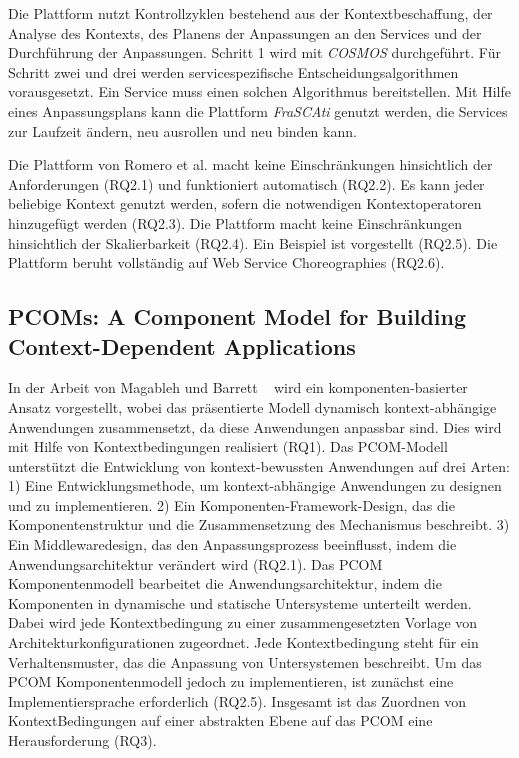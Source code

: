 \documentclass[conference,compsoc]{IEEEtran}
\begin{document}
Die Plattform nutzt Kontrollzyklen bestehend aus der Kontextbeschaffung, der Analyse des Kontexts, des Planens der Anpassungen an den Services und der Durchführung der Anpassungen. Schritt 1 wird mit \textit{COSMOS} durchgeführt. Für Schritt zwei und drei werden servicespezifische Entscheidungsalgorithmen vorausgesetzt. Ein Service muss einen solchen Algorithmus bereitstellen. Mit Hilfe eines Anpassungsplans kann die Plattform \textit{FraSCAti} genutzt werden, die Services zur Laufzeit ändern, neu ausrollen und neu binden kann.

Die Plattform von Romero et al. \cite{RRS10} macht keine Einschränkungen hinsichtlich der Anforderungen (RQ2.1) und funktioniert automatisch (RQ2.2). Es kann jeder beliebige Kontext genutzt werden, sofern die notwendigen Kontextoperatoren hinzugefügt werden (RQ2.3). Die Plattform macht keine Einschränkungen hinsichtlich der Skalierbarkeit (RQ2.4). Ein Beispiel ist vorgestellt (RQ2.5). Die Plattform beruht vollständig auf Web Service Choreographies (RQ2.6).

\subsection{PCOMs: A Component Model for Building Context-Dependent Applications}
In der Arbeit von Magableh und Barrett ~\cite{magableh2009pcoms} wird ein komponenten-basierter Ansatz vorgestellt, wobei das präsentierte Modell dynamisch kontext-abhängige Anwendungen zusammensetzt, da diese Anwendungen anpassbar sind. Dies wird mit Hilfe von Kontextbedingungen realisiert (RQ1). Das PCOM-Modell unterstützt die Entwicklung von kontext-bewussten Anwendungen auf drei Arten: 1) Eine Entwicklungsmethode, um kontext-abhängige Anwendungen zu designen und zu implementieren. 2) Ein Komponenten-Framework-Design, das die Komponentenstruktur und die Zusammensetzung des Mechanismus beschreibt. 3) Ein Middlewaredesign, das den Anpassungsprozess beeinflusst, indem die Anwendungsarchitektur verändert wird (RQ2.1). Das PCOM Komponentenmodell bearbeitet die Anwendungsarchitektur, indem die Komponenten in dynamische und statische Untersysteme unterteilt werden. Dabei wird jede Kontextbedingung zu einer zusammengesetzten Vorlage von Architekturkonfigurationen zugeordnet. Jede Kontextbedingung steht für ein Verhaltensmuster, das die Anpassung von Untersystemen beschreibt. Um das PCOM Komponentenmodell jedoch zu implementieren, ist zunächst eine Implementiersprache erforderlich (RQ2.5). Insgesamt ist das Zuordnen von KontextBedingungen auf einer abstrakten Ebene auf das PCOM eine Herausforderung (RQ3).
\end{document}
